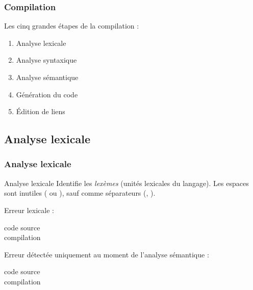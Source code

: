 \documentclass[xcolor=svgnames]{beamer}
\begin{document}
\begin{frame}
  \frametitle{Compilation}
 
Les cinq grandes étapes de la compilation :

  \begin{enumerate}
  \item Analyse lexicale
  \item Analyse syntaxique
  \item Analyse sémantique
  \item Génération du code
  \item Édition de liens
\end{enumerate}
\end{frame}

\subsection{Analyse lexicale}
\begin{frame}
  \frametitle{Analyse lexicale}
\begin{block}{Analyse lexicale}
 Identifie les \emph{lexèmes} (unités lexicales du langage). Les espaces sont inutiles ( ou ), sauf comme séparateurs (, ).
\end{block}
\pause
Erreur lexicale :
\begin{description}
\item[code source] 
\item[compilation] 
\end{description}
\pause
Erreur détectée uniquement au moment de l'analyse sémantique :\\
\begin{description}
\item[code source] 
\item[compilation]  
\end{description}
\end{frame}
\end{document}
